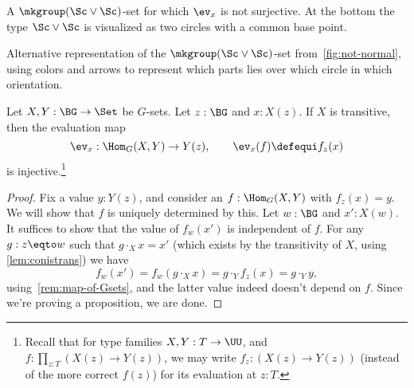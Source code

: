 \begin{marginfigure}
  \caption{A $\mkgroup(\Sc\vee\Sc)$-set for which $\protect\ev_x$ is not
   surjective. At the bottom the type $\Sc\vee\Sc$ is visualized as
   two circles with a common base point. }
  \label{fig:not-normal}
\end{marginfigure}

\begin{marginfigure}
  \noindent{}
  \caption{Alternative representation of the $\mkgroup(\Sc\vee\Sc)$-set
    from~\cref{fig:not-normal},
    using colors and arrows to represent which
    parts lies over which circle in which orientation.}
  \label{fig:not-normal-graph}
\end{marginfigure}

\begin{lemma}
  \label{lem:evisinjwhentransitive}
  Let $X,Y:\BG\to\Set$ be $G$-sets. Let $z:\BG$ and $x:X(z)$.
  If $X$ is transitive, then the evaluation map
  \[
    \ev_x:\Hom_G(X, Y)\to Y(z),\qquad \ev_x(f)\defequi f_z(x)
  \]
  is injective.\footnote{%
    Recall that for type families $X,Y:T\to\UU$, and
    $f:\prod_{z:T}(X(z)\to Y(z))$, we may write $f_z:(X(z)\to Y(z))$
    (instead of the more correct $f(z)$) for its evaluation at $z:T$.}
\end{lemma}
\begin{proof}
  Fix a value $y:Y(z)$, and consider an $f:\Hom_G(X,Y)$ with $f_z(x)=y$.
  We will show that $f$ is uniquely determined by this.
  Let $w:\BG$ and  $x':X(w)$. It suffices to show that the value
  of $f_w(x')$ is independent of $f$.
  For any $g:z\eqto w$ such that $g\cdot_X x=x'$
  (which exists by the transitivity of $X$, using \cref{lem:conistrans})
  we have
  \[
    f_w(x')=f_w(g\cdot_X x)=g \cdot_Y f_z(x)=g \cdot_Y y,
  \]
  using~\cref{rem:map-of-Gsets},
  and the latter value indeed doesn't depend on $f$.
  Since we're proving a proposition, we are done.
\end{proof}

